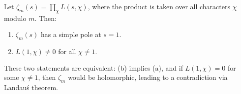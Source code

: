 Let $\zeta_m(s) = \prod_\chi L(s,\chi)$, where the product is taken over all characters $\chi$ modulo $m$. Then:
\begin{enumerate}
\item[(a)] $\zeta_m(s)$ has a simple pole at $s=1$.
\item[(b)] $L(1,\chi) \neq 0$ for all $\chi \neq 1$.
\end{enumerate}
These two statements are equivalent: (b) implies (a), and if $L(1,\chi) = 0$ for some $\chi \neq 1$, then $\zeta_m$ would be holomorphic, leading to a contradiction via Landau\'s theorem.
